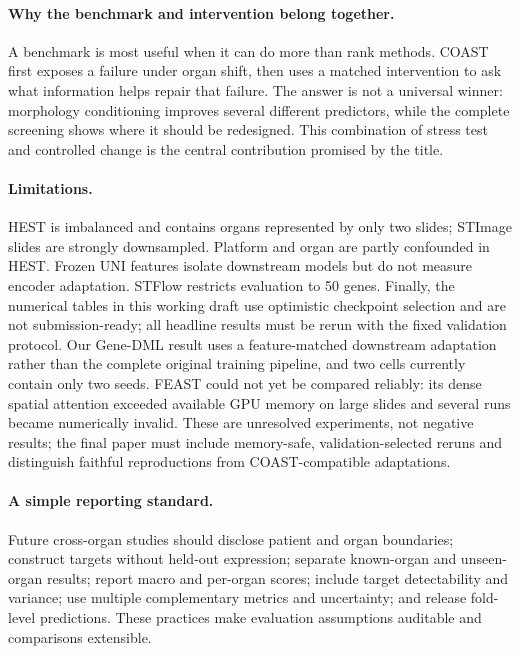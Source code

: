 \paragraph{Why the benchmark and intervention belong together.}
A benchmark is most useful when it can do more than rank methods. COAST first exposes a failure under
organ shift, then uses a matched intervention to ask what information helps repair that failure. The
answer is not a universal winner: morphology conditioning improves several different predictors,
while the complete screening shows where it should be redesigned. This combination of stress test and
controlled change is the central contribution promised by the title.

\paragraph{Limitations.}
HEST is imbalanced and contains organs represented by only two slides; STImage slides are strongly
downsampled. Platform and organ are partly confounded in HEST. Frozen UNI features isolate downstream
models but do not measure encoder adaptation. STFlow restricts evaluation to 50 genes. Finally, the
numerical tables in this working draft use optimistic checkpoint selection and are not submission-ready;
all headline results must be rerun with the fixed validation protocol. Our Gene-DML result uses a
feature-matched downstream adaptation rather than the complete original training pipeline, and two
cells currently contain only two seeds. FEAST could not yet be compared reliably: its dense spatial
attention exceeded available GPU memory on large slides and several runs became numerically invalid.
These are unresolved experiments, not negative results; the final paper must include memory-safe,
validation-selected reruns and distinguish faithful reproductions from COAST-compatible adaptations.

\paragraph{A simple reporting standard.}
Future cross-organ studies should disclose patient and organ boundaries; construct targets without
held-out expression; separate known-organ and unseen-organ results; report macro and per-organ scores;
include target detectability and variance; use multiple complementary metrics and uncertainty; and
release fold-level predictions. These practices make evaluation assumptions auditable and comparisons
extensible.

